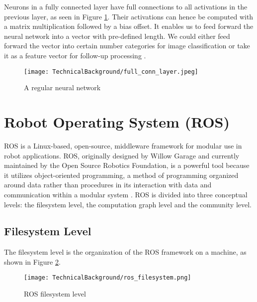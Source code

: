 \begin{description}[leftmargin=0in, labelindent=0pt]
{}

\item[Full Connected Layer] {Neurons in a fully connected layer have full connections to all activations in the previous layer, as seen in Figure \ref{fig:full_conn_layer}. Their activations can hence be computed with a matrix multiplication followed by a bias offset. It enables us to feed forward the neural network into a vector with pre-defined length. We could either feed forward the vector into certain number categories for image classification \cite{krizhevsky2012} or take it as a feature vector for follow-up processing \cite{DBLP:journals/corr/GirshickDDM13}.  

\begin{figure}[h!]
  \centering
  \texttt{[image: TechnicalBackground/full\_conn\_layer.jpeg]}
  \caption{A regular neural network \cite{cnnlecture2017}}
  \label{fig:full_conn_layer}
\end{figure}

}
\end{description}


\section{Robot Operating System (ROS)}
\label{subsec:ros}
ROS is a Linux-based, open-source, middleware framework for modular use in robot applications. ROS, originally designed by Willow Garage and currently maintained by the Open Source Robotics Foundation, is a powerful tool because it utilizes object-oriented programming, a method of programming organized around data rather than procedures in its interaction with data and communication within a modular system \cite{rosintro}. ROS is divided into three conceptual levels: the filesystem level, the computation graph level and the community level.

\subsection{Filesystem Level}
The filesystem level is the organization of the ROS framework on a machine, as shown in Figure \ref{fig:ros_filesystem}. 

\begin{figure}[h!]
  \centering
  \texttt{[image: TechnicalBackground/ros\_filesystem.png]}
  \caption{ROS filesystem level}
  \label{fig:ros_filesystem}
\end{figure}

